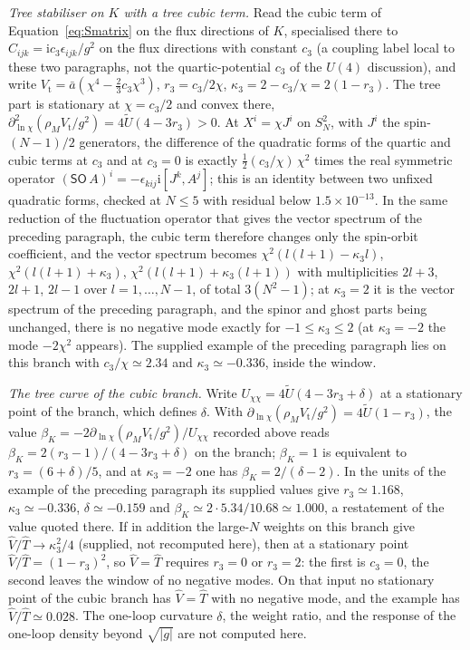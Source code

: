 \emph{Tree stabiliser on \(K\) with a tree cubic term.} Read the cubic term of Equation~\eqref{eq:Smatrix} on the flux directions of \(K\), specialised there to \(C_{ijk}=\mathrm i c_3\epsilon_{ijk}/g^2\) on the flux directions with constant \(c_3\) (a coupling label local to these two paragraphs, not the quartic-potential \(c_3\) of the \(U(4)\) discussion), and write \(V_{\mathrm t}=\bar a(\chi^4-\tfrac23c_3\chi^3)\), \(r_3=c_3/2\chi\), \(\kappa_3=2-c_3/\chi=2(1-r_3)\). The tree part is stationary at \(\chi=c_3/2\) and convex there, \(\partial^2_{\ln\chi}(\rho_MV_{\mathrm t}/g^2)=4\tilde U(4-3r_3)>0\). At \(X^i=\chi J^i\) on \(S^2_N\), with \(J^i\) the spin-\((N-1)/2\) generators, the difference of the quadratic forms of the quartic and cubic terms at \(c_3\) and at \(c_3=0\) is exactly \(\tfrac12(c_3/\chi)\,\chi^2\) times the real symmetric operator \((\mathsf{SO}\,A)^i=-\epsilon_{kij}\mathrm i[J^k,A^j]\); this is an identity between two unfixed quadratic forms, checked at \(N\le5\) with residual below \(1.5\times10^{-13}\). In the same reduction of the fluctuation operator that gives the vector spectrum of the preceding paragraph, the cubic term therefore changes only the spin-orbit coefficient, and the vector spectrum becomes \(\chi^2(l(l+1)-\kappa_3l)\), \(\chi^2(l(l+1)+\kappa_3)\), \(\chi^2(l(l+1)+\kappa_3(l+1))\) with multiplicities \(2l+3\), \(2l+1\), \(2l-1\) over \(l=1,\dots,N-1\), of total \(3(N^2-1)\); at \(\kappa_3=2\) it is the vector spectrum of the preceding paragraph, and the spinor and ghost parts being unchanged, there is no negative mode exactly for \(-1\le\kappa_3\le2\) (at \(\kappa_3=-2\) the mode \(-2\chi^2\) appears). The supplied example of the preceding paragraph lies on this branch with \(c_3/\chi\simeq2.34\) and \(\kappa_3\simeq-0.336\), inside the window.

\emph{The tree curve of the cubic branch.} Write \(U_{\chi\chi}=4\tilde U(4-3r_3+\delta)\) at a stationary point of the branch, which defines \(\delta\). With \(\partial_{\ln\chi}(\rho_MV_{\mathrm t}/g^2)=4\tilde U(1-r_3)\), the value \(\beta_K=-2\partial_{\ln\chi}(\rho_MV_{\mathrm t}/g^2)/U_{\chi\chi}\) recorded above reads \(\beta_K=2(r_3-1)/(4-3r_3+\delta)\) on the branch; \(\beta_K=1\) is equivalent to \(r_3=(6+\delta)/5\), and at \(\kappa_3=-2\) one has \(\beta_K=2/(\delta-2)\). In the units of the example of the preceding paragraph its supplied values give \(r_3\simeq1.168\), \(\kappa_3\simeq-0.336\), \(\delta\simeq-0.159\) and \(\beta_K\simeq2\cdot5.34/10.68\simeq1.000\), a restatement of the value quoted there. If in addition the large-\(N\) weights on this branch give \(\hat V/\hat T\to\kappa_3^2/4\) (supplied, not recomputed here), then at a stationary point \(\hat V/\hat T=(1-r_3)^2\), so \(\hat V=\hat T\) requires \(r_3=0\) or \(r_3=2\): the first is \(c_3=0\), the second leaves the window of no negative modes. On that input no stationary point of the cubic branch has \(\hat V=\hat T\) with no negative mode, and the example has \(\hat V/\hat T\simeq0.028\). The one-loop curvature \(\delta\), the weight ratio, and the response of the one-loop density beyond \(\sqrt{|g|}\) are not computed here.

